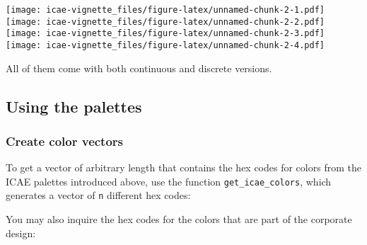 \documentclass[]{article}
\newenvironment{Shaded}{\begin{snugshade}}{\end{snugshade}}
\newcommand{\KeywordTok}[1]{\textcolor[rgb]{0.13,0.29,0.53}{\textbf{#1}}}
\newcommand{\DataTypeTok}[1]{\textcolor[rgb]{0.13,0.29,0.53}{#1}}
\newcommand{\DecValTok}[1]{\textcolor[rgb]{0.00,0.00,0.81}{#1}}
\newcommand{\StringTok}[1]{\textcolor[rgb]{0.31,0.60,0.02}{#1}}
\newcommand{\CommentTok}[1]{\textcolor[rgb]{0.56,0.35,0.01}{\textit{#1}}}
\newcommand{\OtherTok}[1]{\textcolor[rgb]{0.56,0.35,0.01}{#1}}
\newcommand{\NormalTok}[1]{#1}
\begin{document}
\texttt{[image: icae-vignette\_files/figure-latex/unnamed-chunk-2-1.pdf]}
\texttt{[image: icae-vignette\_files/figure-latex/unnamed-chunk-2-2.pdf]}
\texttt{[image: icae-vignette\_files/figure-latex/unnamed-chunk-2-3.pdf]}
\texttt{[image: icae-vignette\_files/figure-latex/unnamed-chunk-2-4.pdf]}

All of them come with both continuous and discrete versions.

\subsection{Using the palettes}\label{using-the-palettes}

\subsubsection{Create color vectors}\label{create-color-vectors}

To get a vector of arbitrary length that contains the hex codes for
colors from the ICAE palettes introduced above, use the function
\texttt{get\_icae\_colors}, which generates a vector of \texttt{n}
different hex codes:

\begin{Shaded}
\end{Shaded}

You may also inquire the hex codes for the colors that are part of the
corporate design:
\end{document}
